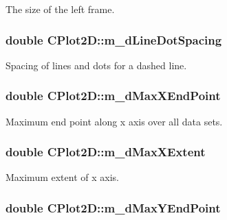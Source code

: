 The size of the left frame. \hypertarget{class_c_plot2_d_ab8bb9d348dcda0bbc15fa5e1b92cb07d}{
\subsubsection[{m\-\_\-d\-Line\-Dot\-Spacing}]{\setlength{\rightskip}{0pt plus 5cm}double C\-Plot2\-D\-::m\-\_\-d\-Line\-Dot\-Spacing\hspace{0.3cm}{\ttfamily [protected]}}}\label{class_c_plot2_d_ab8bb9d348dcda0bbc15fa5e1b92cb07d}
Spacing of lines and dots for a dashed line. \hypertarget{class_c_plot2_d_a8027d1df47162ac98bcabd71e981b13d}{
\subsubsection[{m\-\_\-d\-Max\-X\-End\-Point}]{\setlength{\rightskip}{0pt plus 5cm}double C\-Plot2\-D\-::m\-\_\-d\-Max\-X\-End\-Point\hspace{0.3cm}{\ttfamily [protected]}}}\label{class_c_plot2_d_a8027d1df47162ac98bcabd71e981b13d}
Maximum end point along x axis over all data sets. \hypertarget{class_c_plot2_d_a15c813fb85f96dd62cea6af3baa4aeba}{
\subsubsection[{m\-\_\-d\-Max\-X\-Extent}]{\setlength{\rightskip}{0pt plus 5cm}double C\-Plot2\-D\-::m\-\_\-d\-Max\-X\-Extent\hspace{0.3cm}{\ttfamily [protected]}}}\label{class_c_plot2_d_a15c813fb85f96dd62cea6af3baa4aeba}
Maximum extent of x axis. \hypertarget{class_c_plot2_d_a1fd531f0edce75939f3ea0971dcdf37d}{
\subsubsection[{m\-\_\-d\-Max\-Y\-End\-Point}]{\setlength{\rightskip}{0pt plus 5cm}double C\-Plot2\-D\-::m\-\_\-d\-Max\-Y\-End\-Point\hspace{0.3cm}{\ttfamily [protected]}}}\label{class_c_plot2_d_a1fd531f0edce75939f3ea0971dcdf37d}
